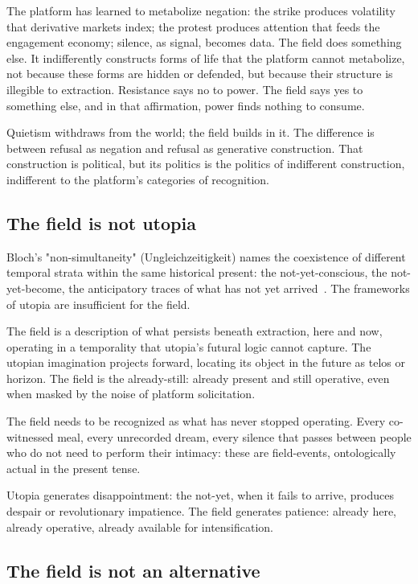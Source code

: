 The platform has learned to metabolize negation: the strike produces volatility that derivative markets index; the protest produces attention that feeds the engagement economy; silence, as signal, becomes data. The field does something else. It indifferently constructs forms of life that the platform cannot metabolize, not because these forms are hidden or defended, but because their structure is illegible to extraction. Resistance says no to power. The field says yes to something else, and in that affirmation, power finds nothing to consume.

Quietism withdraws from the world; the field builds in it. The difference is between refusal as negation and refusal as generative construction. That construction is political, but its politics is the politics of indifferent construction, indifferent to the platform's categories of recognition.

\subsection{The field is not utopia}

Bloch's "non-simultaneity" (Ungleichzeitigkeit) names the coexistence of different temporal strata within the same historical present: the not-yet-conscious, the not-yet-become, the anticipatory traces of what has not yet arrived~\cite{bloch1932}. The frameworks of utopia are insufficient for the field.

The field is a description of what persists beneath extraction, here and now, operating in a temporality that utopia's futural logic cannot capture. The utopian imagination projects forward, locating its object in the future as telos or horizon. The field is the already-still: already present and still operative, even when masked by the noise of platform solicitation.

The field needs to be recognized as what has never stopped operating. Every co-witnessed meal, every unrecorded dream, every silence that passes between people who do not need to perform their intimacy: these are field-events, ontologically actual in the present tense.

Utopia generates disappointment: the not-yet, when it fails to arrive, produces despair or revolutionary impatience. The field generates patience: already here, already operative, already available for intensification.

\subsection{The field is not an alternative}

